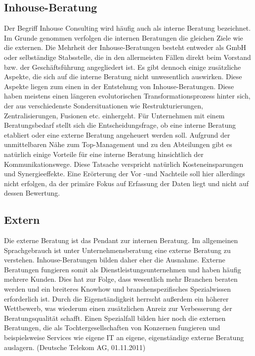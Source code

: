 \subsection*{Inhouse-Beratung}
Der Begriff Inhouse Consulting wird häufig auch als interne Beratung bezeichnet. \cite[150]{ReinekeBock200709}
Im Grunde genommen verfolgen die internen Beratungen die gleichen Ziele wie die externen. Die Mehrheit der Inhouse-Beratungen besteht entweder als GmbH oder selbständige Stabsstelle, die in den allermeisten Fällen direkt beim Vorstand bzw. der Geschäftsführung angegliedert ist. \cite[14]{B2_InhouseConsulting}
Es gibt dennoch einige zusätzliche Aspekte, die sich auf die interne Beratung nicht unwesentlich auswirken. Diese Aspekte liegen zum einen in der Entstehung von Inhouse-Beratungen. Diese haben meistens einen längeren evolutorischen Transformationsprozess hinter sich, der aus verschiedenste Sondersituationen wie Restrukturierungen, Zentralisierungen, Fusionen etc. einhergeht. \cite[160]{Lippold201309}
Für Unternehmen mit einem Beratungsbedarf stellt sich die Entscheidungsfrage, ob eine interne Beratung etabliert oder eine externe Beratung angeheuert werden soll.
Aufgrund der unmittelbaren Nähe zum Top-Management und zu den Abteilungen gibt es natürlich einige Vorteile für eine interne Beratung hinsichtlich der Kommunikationswege.
Diese Tatsache verspricht natürlich Kosteneinsparungen und Synergieeffekte. Eine Erörterung der Vor -und Nachteile soll hier allerdings nicht erfolgen, da der primäre Fokus auf Erfassung der Daten liegt und nicht auf dessen Bewertung.

\subsection*{Extern}
Die externe Beratung ist das Pendant zur internen Beratung. Im allgemeinen Sprachgebrauch ist unter Unternehmensberatung eine externe Beratung zu verstehen. Inhouse-Beratungen bilden daher eher die Ausnahme. Externe Beratungen fungieren somit als Dienstleistungsunternehmen und haben häufig mehrere Kunden. Dies hat zur Folge, dass wesentlich mehr Branchen beraten werden und ein breiteres Knowhow und branchenspezifisches Spezialwissen erforderlich ist. Durch die Eigenständigkeit herrscht außerdem ein höherer Wettbewerb, was wiederum einen zusätzlichen Anreiz zur Verbesserung der Beratungsqualität schafft.
Einen Spezialfall bilden hier noch die externen Beratungen, die als Tochtergesellschaften von Konzernen fungieren und beispielsweise Services wie eigene IT an eigene, eigenständige externe Beratung auslagern. (Deutsche Telekom AG, 01.11.2011)

